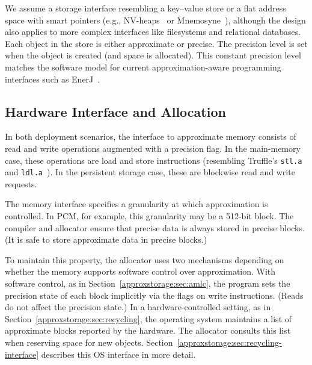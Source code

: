 We assume a storage interface resembling a key--value store or a flat address
space with smart pointers (e.g., NV-heaps~\cite{nvheaps} or
Mnemosyne~\cite{mnemosyne}), although the design also applies to more
complex interfaces like filesystems and relational databases. Each
object in the store is either approximate or precise. The precision level is
set when the object is created (and space is allocated).
This constant precision level matches the software model for current
approximation-aware programming interfaces such as EnerJ~\cite{enerj}.

\subsection{Hardware Interface and Allocation}

In both deployment scenarios, the interface to approximate memory consists of read
and write operations augmented with a precision flag.
In the main-memory case, these operations are load and store instructions
(resembling Truffle's \verb+stl.a+ and \verb+ldl.a+~\cite{truffle}).
In the persistent storage case, these are blockwise read and write requests.

The memory interface specifies a granularity at which approximation is
controlled. In PCM, for example, this granularity may be a 512-bit block. The
compiler and allocator ensure that precise data is always stored in
precise blocks.
(It is safe to store approximate data
in precise blocks.)

To maintain this property, the allocator uses
two mechanisms depending on whether the memory supports software control over
approximation.
With software control, as in Section~\ref{approxstorage:sec:amlc}, the program sets the precision state
of each block implicitly via the flags on write instructions. (Reads do not
affect the precision state.)
In a hardware-controlled setting, as in Section~\ref{approxstorage:sec:recycling}, the operating system maintains a
list of approximate blocks reported by the hardware.
The allocator consults this list when reserving
space for new objects. Section~\ref{approxstorage:sec:recycling-interface} describes this OS
interface in more detail.

